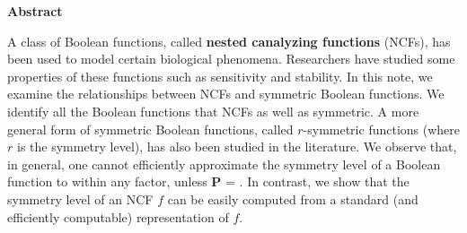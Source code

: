 \vspace*{-0.05in}
\begin{center}
\textbf{Abstract}  %
\end{center}

\smallskip

A class of Boolean functions, 
called \textbf{nested canalyzing functions} (NCFs),
has been used to model certain biological phenomena.
Researchers have studied some properties of these functions
such as sensitivity and stability.
In this note, we examine the relationships between NCFs and symmetric 
Boolean functions. 
We identify all the Boolean functions that NCFs as well as symmetric. 
A more general form of symmetric Boolean functions,
called $r$-symmetric functions (where $r$ is the symmetry level),
has also been studied in the literature.
We observe that, in general,
one cannot efficiently approximate the symmetry level of
a Boolean function to within any factor, unless \textbf{P} = \cnp. 
In contrast, we show that the symmetry level of an NCF $f$
can be easily computed from a standard (and efficiently
computable) representation of $f$.

